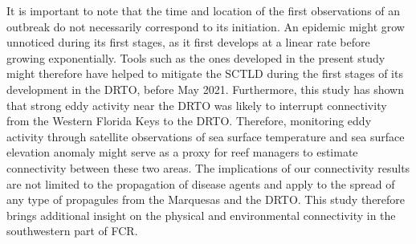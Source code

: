 It is important to note that the time and location of the first observations of an outbreak do not necessarily correspond to its initiation. An epidemic might grow unnoticed during its first stages, as it first develops at a linear rate before growing exponentially. Tools such as the ones developed in the present study might therefore have helped to mitigate the SCTLD during the first stages of its development in the DRTO, before May 2021. Furthermore, this study has shown that strong eddy activity near the DRTO was likely to interrupt connectivity from the Western Florida Keys to the DRTO. Therefore, monitoring eddy activity through satellite observations of sea surface temperature and sea surface elevation anomaly \citep{kourafalou2018physical} might serve as a proxy for reef managers to estimate connectivity between these two areas. The implications of our connectivity results are not limited to the propagation of disease agents and apply to the spread of any type of propagules from the Marquesas and the DRTO. This study therefore brings additional insight on the physical and environmental connectivity in the southwestern part of FCR.
